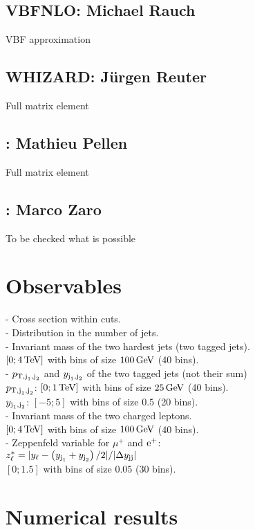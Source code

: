 \documentclass[a4paper,10pt]{report}
\begin{document}
\subsection{ {\sc VBFNLO}: Michael Rauch}
VBF approximation \\
\subsection{ {\sc WHIZARD}: J\"urgen Reuter}
Full matrix element \\
\subsection{ \recola: Mathieu Pellen}
Full matrix element \\
\subsection{ \madgraph: Marco Zaro}
To be checked what is possible \\

\section{Observables}
- Cross section within cuts. \\
- Distribution in the number of jets. \\
- Invariant mass of the two hardest jets (two tagged jets). \\
$[0; 4\,\text{TeV}]$ with bins of size $100\,\text{GeV}$ (40 bins). \\
- $p_{\text{T},\text{j}_1,\text{j}_2}$ and $y_{\text{j}_1,\text{j}_2}$ of the two tagged jets (not their sum) \\
$p_{\text{T},\text{j}_1,\text{j}_2}$: $[0; 1\,\text{TeV}]$ with bins of size $25\,\text{GeV}$ (40 bins). \\
$y_{\text{j}_1,\text{j}_2}$: $[-5;5]$ with bins of size $0.5$ (20 bins). \\
- Invariant mass of the two charged leptons. \\
$[0; 4\,\text{TeV}]$ with bins of size $100\,\text{GeV}$ (40 bins). \\
- Zeppenfeld variable for $\mu^+$ and $\text{e}^+$: \\
$z^*_\ell = |y_\ell - \left(y_{\text{j}_1}+y_{\text{j}_2} \right)/2|/|\Delta y_{\text{j}\text{j}}|$ \\
$[0;1.5]$ with bins of size $0.05$ (30 bins).

\section{Numerical results}
\end{document}
